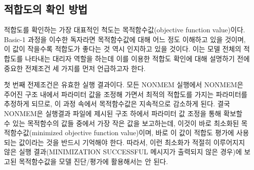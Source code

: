 \documentclass[
  10pt,
  krantz2,
  a4paper]{krantz}
\theoremstyle{definition}
\theoremstyle{definition}
\theoremstyle{definition}
\theoremstyle{remark}
\begin{document}

\hypertarget{uxc801uxd569uxb3c4uxc758-uxd655uxc778-uxbc29uxbc95}{%
\subsection{\texorpdfstring{적합도의 확인 방법}{적합도의 확인 방법}}\label{uxc801uxd569uxb3c4uxc758-uxd655uxc778-uxbc29uxbc95}}

적합도를 확인하는 가장 대표적인 척도는 목적함수값(objective function value)이다. Basic-1 과정을 이수한 독자라면 목적함수값에 대해 어느 정도 이해하고 있을 것이며, 이 값이 작을수록 적합도가 좋다는 것 역시 인지하고 있을 것이다. 이는 모델 전체의 적합도를 나타내는 대리자 역할을 하는데 이를 이용한 적합도 확인에 대해 설명하기 전에 중요한 전제조건 세 가지를 먼저 언급하고자 한다.

첫 번째 전제조건은 유효한 실행 결과이다. 모든 NONMEM 실행에서 NONMEM은 주어진 구조 내에서 파라미터 값을 조정해 가면서 최적의 적합도를 가지는 파라미터를 추정하게 되므로, 이 과정 속에서 목적함수값은 지속적으로 감소하게 된다. 결국 NONMEM은 실행결과 파일에 제시된 구조 하에서 파라미터 값 조정을 통해 확보할 수 있는 목적함수의 값들 중에서 가장 작은 값을 보고하는데, 이것이 바로 최소화된 목적함수값(minimized objective function value)이며, 바로 이 값이 적합도 평가에 사용되는 값이라는 것을 반드시 기억해야 한다. 따라서, 이런 최소화가 적절히 이루어지지 않은 실행 결과(MINIMIZATION SUCCESSFUL 메시지가 출력되지 않은 경우)에 보고된 목적함수값을 모델 진단/평가에 활용해서는 안 된다.
\end{document}
